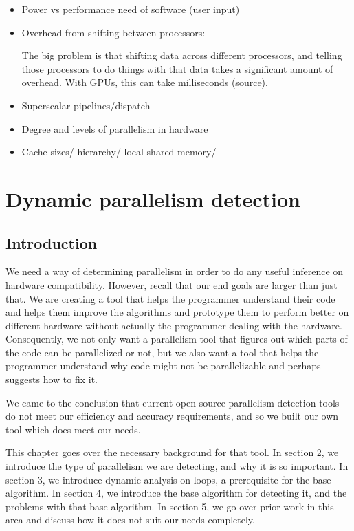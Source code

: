 \documentclass[12pt,twoside]{reedthesis}
\begin{document}
	\begin{itemize}
		\item Power vs performance need of software (user input)

		\item Overhead from shifting between processors:

		The big problem is that shifting data across different processors, and telling those processors to do things with that data takes a significant amount of overhead. With GPUs, this can take milliseconds (source).

		\item Superscalar pipelines/dispatch

		\item Degree and levels of parallelism in hardware

		\item Cache sizes/ hierarchy/ local-shared memory/

	\end{itemize}

\chapter{Dynamic parallelism detection}

	\section{Introduction}
	
		We need a way of determining parallelism in order to do any useful inference on hardware compatibility. However, recall that our end goals are larger than just that. We are creating a tool that helps the programmer understand their code and helps them improve the algorithms and prototype them to perform better on different hardware without actually the programmer dealing with the hardware. Consequently, we not only want a parallelism tool that figures out which parts of the code can be parallelized or not, but we also want a tool that helps the programmer understand why code might not be parallelizable and perhaps suggests how to fix it. 
		 
		We came to the conclusion that current open source parallelism detection tools do not meet our efficiency and accuracy requirements, and so we built our own tool which does meet our needs. 
		
		This chapter goes over the necessary background for that tool. In section 2, we introduce the type of parallelism we are detecting, and why it is so important. In section 3, we introduce dynamic analysis on loops, a prerequisite for the base algorithm. In section 4, we introduce the base algorithm for detecting it, and the problems with that base algorithm. In section 5, we go over prior work in this area and discuss how it does not suit our needs completely. 
		
\end{document}
